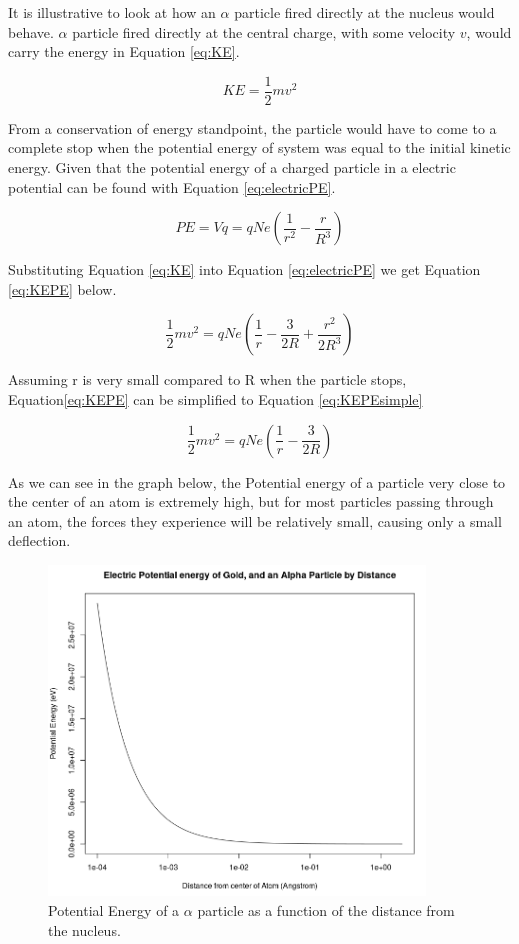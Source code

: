 \documentclass[12pt]{article}
\begin{document}
It is illustrative to look at how an $\alpha$ particle fired directly at the nucleus would behave. $\alpha$ particle fired directly at the central charge, with some velocity $v$, would carry the energy in Equation \ref{eq:KE}.

\begin{equation}\label{eq:KE}
    KE = \frac{1}{2}mv^2
\end{equation}

From a conservation of energy standpoint, the particle would have to come to a complete stop when the potential energy of system was equal to the initial kinetic energy.
Given that the potential energy of a charged particle in a electric potential can be found with Equation \ref{eq:electricPE}.

\begin{equation}\label{eq:electricPE}
    PE = Vq = qNe(\frac{1}{r^2} - \frac{r}{R^3})
\end{equation}

Substituting Equation \ref{eq:KE} into Equation \ref{eq:electricPE} we get Equation \ref{eq:KEPE} below.

\begin{equation}\label{eq:KEPE}
    \frac{1}{2}mv^2 =  qNe(\frac{1}{r} - \frac{3}{2R} + \frac{r^2}{2R^3})
\end{equation}

Assuming r is very small compared to R when the particle stops, Equation\ref{eq:KEPE} can be simplified to Equation \ref{eq:KEPEsimple}

\begin{equation}\label{eq:KEPEsimple}
    \frac{1}{2}mv^2 = qNe(\frac{1}{r} - \frac{3}{2R})
\end{equation}

As we can see in the graph below, the Potential energy of a particle very close to the center of an atom is extremely high, but for most particles passing through an atom, the forces they experience will be relatively small, causing only a small deflection.

\begin{figure}
    \centering
    \includegraphics[width = 10cm]{ruthenergy}
    \caption{Potential Energy of a $\alpha$ particle as a function of the distance from the nucleus.}
    \label{fig:ruthenergy}
\end{figure}
\end{document}
